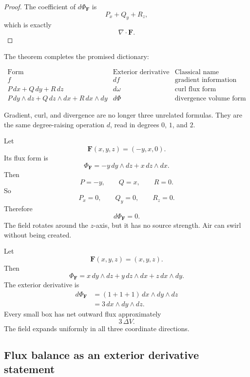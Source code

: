 \begin{proof}
The coefficient of \(d\Phi_{\mathbf F}\) is
\[
    P_x+Q_y+R_z,
\]
which is exactly
\[
    \nabla\cdot\mathbf F.
\]
\end{proof}

The theorem completes the promised dictionary:

\[
\begin{array}{c|c|c}
\text{Form} & \text{Exterior derivative} & \text{Classical name}\\ \hline
f & df & \text{gradient information}\\[1mm]
P\,dx+Q\,dy+R\,dz & d\omega & \text{curl flux form}\\[1mm]
P\,dy\wedge dz+Q\,dz\wedge dx+R\,dx\wedge dy & d\Phi &
\text{divergence volume form}
\end{array}
\]

Gradient, curl, and divergence are no longer three unrelated formulas.  They are the
same degree-raising operation \(d\), read in degrees \(0\), \(1\), and \(2\).

\begin{example}
Let
\[
    \mathbf F(x,y,z)=(-y,x,0).
\]
Its flux form is
\[
    \Phi_{\mathbf F}
    =
    -y\,dy\wedge dz
    +
    x\,dz\wedge dx.
\]
Then
\[
    P=-y,\qquad Q=x,\qquad R=0.
\]
So
\[
    P_x=0,\qquad Q_y=0,\qquad R_z=0.
\]
Therefore
\[
\boxed{
    d\Phi_{\mathbf F}=0.
}
\]
The field rotates around the \(z\)-axis, but it has no source strength.  Air can swirl
without being created.
\end{example}

\begin{example}
Let
\[
    \mathbf F(x,y,z)=(x,y,z).
\]
Then
\[
    \Phi_{\mathbf F}
    =
    x\,dy\wedge dz
    +
    y\,dz\wedge dx
    +
    z\,dx\wedge dy.
\]
The exterior derivative is
\[
\begin{aligned}
d\Phi_{\mathbf F}
&=
(1+1+1)\,dx\wedge dy\wedge dz\\
&=
3\,dx\wedge dy\wedge dz.
\end{aligned}
\]
Every small box has net outward flux approximately
\[
    3\,\Delta V.
\]
The field expands uniformly in all three coordinate directions.
\end{example}

\subsection{Flux balance as an exterior derivative statement}

